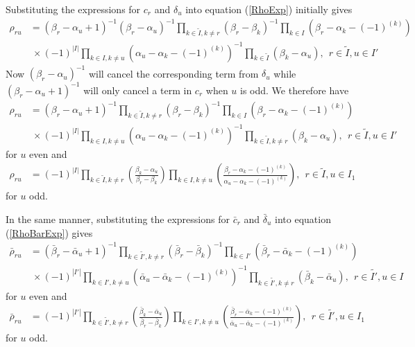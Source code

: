 \documentclass[12pt]{article}
\begin{document}
Substituting the expressions for ${c}_r$ and ${\delta}_u$ into equation 
 (\ref{RhoExp}) initially gives
\begin{align*}
{\rho}_{ru} &= ({\beta}_r-{\alpha}_u + 1)^{-1}({\beta}_r-{\alpha}_u)^{-1} \prod_{k\in \tilde{I},k\neq r} \left(\beta_r - \beta_k \right)^{-1}\prod_{k\in
I} \left(\beta_r - \alpha_k - (-1)^{(k)}\right) \\
& ~\times (-1)^{|I|} \prod_{k\in I,k\neq u} \left(\alpha_u - \alpha_k -
(-1)^{(k)}\right)^{-1}\prod_{k\in\tilde{I}} \left(\beta_k - \alpha_u \right),\ \ r\in \tilde{I},u\in I' 
\end{align*}
Now $({\beta}_r-{\alpha}_u)^{-1}$ will cancel the corresponding term from $\delta_u$ while $
({\beta}_r-{\alpha}_u + 1)^{-1}$ will only cancel a term in $c_r$ when $u$ is odd. We therefore have
\begin{align*}
{\rho}_{ru} &= ({\beta}_r-{\alpha}_u + 1)^{-1}\prod_{k\in \tilde{I},k\neq r} \left(\beta_r - \beta_k \right)^{-1}\prod_{k\in
I} \left(\beta_r - \alpha_k - (-1)^{(k)}\right) \\
& ~\times (-1)^{|I|} \prod_{k\in I,k\neq u} \left(\alpha_u - \alpha_k -
(-1)^{(k)}\right)^{-1}\prod_{k\in\tilde{I},k \neq r} \left(\beta_k - \alpha_u \right),\ \ r\in \tilde{I},u\in I' 
\end{align*}
for $u$ even and
\begin{align*}
{\rho}_{ru} &= (-1)^{|I|} \prod_{k\in \tilde{I},k\neq r} 
\left(
\frac 
{\beta_k - \alpha_u  }
{\beta_r - \beta_k }
\right)
\prod_{k\in I,k \neq u} 
\left(
\frac
{ \beta_r - \alpha_k - (-1)^{(k)} }
{\alpha_u - \alpha_k - (-1)^{(k)} }
\right)
,\ \ r\in \tilde{I},u\in I_1
\end{align*}
for $u$ odd.

In the same manner, substituting the expressions for $\bar{c}_r$ and $\bar{\delta}_u$ into equation 
 (\ref{RhoBarExp}) gives
\begin{align*}
\bar{\rho}_{ru} &= (\bar{\beta}_r-\bar{\alpha}_u + 1)^{-1}\prod_{k\in \tilde{I'},k\neq r} \left(\bar{\beta}_r - \bar{\beta}_k \right)^{-1}\prod_{k\in
I'} \left(\bar{\beta}_r - \bar{\alpha}_k - (-1)^{(k)}\right) \\
& ~\times (-1)^{|I'|} \prod_{k\in I',k\neq u} \left(\bar{\alpha}_u - \bar{\alpha}_k -
(-1)^{(k)}\right)^{-1}\prod_{k\in\tilde{I'},k \neq r} \left(\bar{\beta}_k - \bar{\alpha}_u \right),\ \ r\in \tilde{I'},u\in I 
\end{align*}
for $u$ even and
\begin{align*}
\bar{\rho}_{ru} &= (-1)^{|I'|} \prod_{k\in \tilde{I'},k\neq r} 
\left(
\frac 
{\bar{\beta}_k - \bar{\alpha}_u  }
{\bar{\beta}_r - \bar{\beta}_k }
\right)
\prod_{k\in I',k \neq u} 
\left(
\frac
{ \bar{\beta}_r - \bar{\alpha}_k - (-1)^{(k)} }
{\bar{\alpha}_u - \bar{\alpha}_k - (-1)^{(k)} }
\right)
,\ \ r\in \tilde{I'},u\in I_1
\end{align*}
for $u$ odd.
\end{document}

